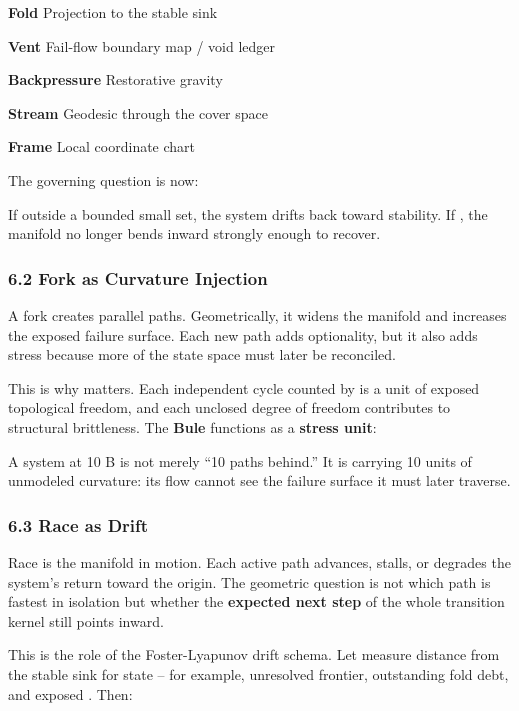\documentclass[
]{article}
\begin{document}
\textbf{Fold} \textbar{} Projection to the stable sink \textbar{}
\textbar{}

\textbf{Vent} \textbar{} Fail-flow boundary map / void ledger \textbar{}
\textbar{}

\textbf{Backpressure} \textbar{} Restorative gravity \textbar{}
\textbar{}

\textbf{Stream} \textbar{} Geodesic through the cover space \textbar{}
\textbar{}

\textbf{Frame} \textbar{} Local coordinate chart \textbar{} \textbar{}

The governing question is now:

If outside a bounded small set, the system drifts back toward stability.
If , the manifold no longer bends inward strongly enough to recover.

\subsubsection{\texorpdfstring{\textbf{6.2 Fork as Curvature
Injection}}{6.2 Fork as Curvature Injection}}\label{fork-as-curvature-injection}

A fork creates parallel paths. Geometrically, it widens the manifold and
increases the exposed failure surface. Each new path adds optionality,
but it also adds stress because more of the state space must later be
reconciled.

This is why matters. Each independent cycle counted by is a unit of
exposed topological freedom, and each unclosed degree of freedom
contributes to structural brittleness. The \textbf{Bule} functions as a
\textbf{stress unit}:

A system at 10 B is not merely ``10 paths behind.'' It is carrying 10
units of unmodeled curvature: its flow cannot see the failure surface it
must later traverse.

\subsubsection{\texorpdfstring{\textbf{6.3 Race as
Drift}}{6.3 Race as Drift}}\label{race-as-drift}

Race is the manifold in motion. Each active path advances, stalls, or
degrades the system's return toward the origin. The geometric question
is not which path is fastest in isolation but whether the
\textbf{expected next step} of the whole transition kernel still points
inward.

This is the role of the Foster-Lyapunov drift schema. Let measure
distance from the stable sink for state -- for example, unresolved
frontier, outstanding fold debt, and exposed . Then:
\end{document}
